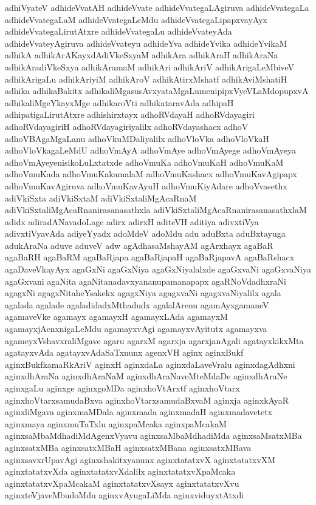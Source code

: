 {adhiVyateV
adhideVvatAH
adhideVvate
adhideVvategaLAgiruva
adhideVvategaLa
adhideVvategaLaM
adhideVvategaLeMdu
adhideVvategaLipapxvayAyx
adhideVvategaLirutAtxre
adhideVvategaLu
adhideVvateyAda
adhideVvateyAgiruva
adhideVvateyu
adhideYva
adhideYvika
adhideYvikaM
adhikA
adhikArAKayxdAdiVkeSxyaM
adhikAra
adhikAraH
adhikAraNa
adhikAradiVkeSxya
adhikAramaM
adhikAri
adhikAriV
adhikArigaLeMbiveV
adhikArigaLu
adhikAriyiM
adhikAroV
adhikAtirxMshatf
adhikAviMshatiH
adhika
adhikaBakitx
adhikaliMgasusAvxyataMgaLumenipipxVyeVLaMdopupxvA
adhikaliMgeYkayxMge
adhikaroVti
adhikataravAda
adhipaH
adhipatigaLirutAtxre
adhishirxtayx
adhoRVdayaH
adhoRVdayagiri
adhoRVdayagiriH
adhoRVdayagiriyalilx
adhoRVdayashacx
adhoV
adhoVBAgaMgaLanu
adhoVkuMDaliyalilx
adhoVloVka
adhoVloVkaH
adhoVloVkagaLeMdU
adhoVmAyA
adhoVmAye
adhoVmAyege
adhoVmAyeya
adhoVmAyeyenisikoLuLxtatxde
adhoVmuKa
adhoVmuKaH
adhoVmuKaM
adhoVmuKada
adhoVmuKakamalaM
adhoVmuKashacx
adhoVmuKavAgipapx
adhoVmuKavAgiruva
adhoVmuKavAyuH
adhoVmuKiyAdare
adhoVvasethx
adiVkiSxta
adiVkiSxtaM
adiVkiSxtaliMgAcaRnaM
adiVkiSxtaliMgAcaRnanirasanasathxla
adiVkiSxtaliMgAcaRnanirasanasathxlaM
adidx
adiradANavadoLage
adirx
adirxH
aditeVH
aditiya
adivxtiVya
adivxtiVyavAda
adiyeYyadx
adoMdeV
adoMdu
adu
aduBxta
aduBxtayuga
adukAraNa
aduve
aduveV
adw
agAdhasaMshayAM
agArxhayx
agaBaR
agaBaRH
agaBaRM
agaBaRjapa
agaBaRjapaH
agaBaRjapavA
agaBaRshacx
agaDaveVkayAyx
agaGxNi
agaGxNiya
agaGxNiyalalxde
agaGxvaNi
agaGxvaNiya
agaGxvani
agaNita
agaNitanadavxyananupamanapapx
agaRNoVdadhxraNi
agagxNi
agagxNitaheYsakekx
agagxNiya
agagxvaNi
agagxvaNiyalilx
agala
agalada
agalade
agaladidadxMthadudx
agalalArenu
agamAyxgamaneV
agamaveVke
agamayx
agamayxH
agamayxLAda
agamayxM
agamayxjAcnxnigaLeMdu
agamayxvAgi
agamayxvAyitutx
agamayxva
agameyxVshavxraliMgave
agaru
agarxM
agarxja
agarxjanAgali
agatayxkikxMta
agatayxvAda
agatayxvAdaSaTxnunx
agenxVH
aginx
aginxBukf
aginxBukfkamaRkAriV
aginxH
aginxdaLa
aginxdaLaveVralu
aginxdagAdhxni
aginxdhAraNa
aginxdhAraNaM
aginxdhAraNaveMteMdaDe
aginxdhAraNe
aginxgaLu
aginxge
aginxgoMDa
aginxhoVtArxtf
aginxhoVtarx
aginxhoVtarxsamudaBxva
aginxhoVtarxsamudaBxvaM
aginxja
aginxkAyaR
aginxliMgava
aginxmaMDala
aginxmada
aginxmadaH
aginxmadavetetx
aginxmaya
aginxmuTaTxlu
aginxpaMcaka
aginxpaMcakaM
aginxsaMbaMdhadiMdAgenxVyavu
aginxsaMbaMdhadiMda
aginxsaMsatxMBa
aginxsatxMBa
aginxsatxMBaH
aginxsatxMBana
aginxsatxMBava
aginxsavxrUpavAgi
aginxshakitxyanunx
aginxtatatxvX
aginxtatatxvXM
aginxtatatxvXda
aginxtatatxvXdalilx
aginxtatatxvXpaMcaka
aginxtatatxvXpaMcakaM
aginxtatatxvXsayx
aginxtatatxvXvu
aginxteVjaveMbudoMdu
aginxvAyugaLiMda
aginxviduyxtAtxdi
}
